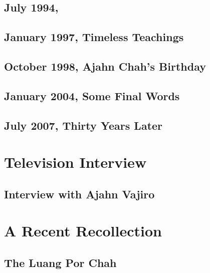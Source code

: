 \documentclass[
  pagePreset=smallpage,
  babelLanguage=british,
]{aruno-anecdote}
\begin{document}
\chapter[July 1994, Recollections by Greg Klein]{July 1994,\newline {}}


\chapter{January 1997, Timeless Teachings}


\chapter{October 1998, Ajahn Chah's Birthday}


\chapter{January 2004, Some Final Words}


\chapter{July 2007, Thirty Years Later}



\part{Television Interview}

\chapter{Interview with Ajahn Vajiro}


\part{A Recent Recollection}

\chapter[The Luang Por Chah Memorial Week]{The Luang Por Chah\newline {}}


\emptypage


\backmatter



\cleartorecto
\thispagestyle{plain}


\clearpage
\thispagestyle{empty}
\mbox{}
\end{document}
